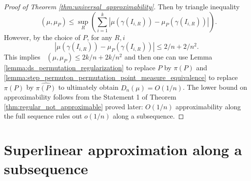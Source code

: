 \documentclass{article}
\newcommand{\ds}{\mathop{d_\square}}
\theoremstyle{definition}
\begin{document}
\begin{proof}[Proof of Theorem \ref{thm:universal_approximability}]
    Then by triangle inequality
    $$\ds (\mu, \mu_P)\leq \sup_R \left(\sum_{i=1}^{k}|\mu(\gamma(I_{i, R}))-\mu_P(\gamma(I_{i, R}))|\right).$$
    However, by the choice of $P$, for any $R, i$ 
    $$|\mu(\gamma(I_{i, R}))-\mu_P(\gamma(I_{i, R}))|\leq 2/n+2/n^2.$$
    This implies $\ds(\mu, \mu_P)\leq 2k/n+2k/n^2$ and then one can use Lemma \ref{lemma:ds_permutation_regularization} to replace $P$ by $\pi(P)$ and \ref{lemma:step_permuton_permutation_point_measure_equivalence} to replace $\pi(P)$ by $\widehat{\pi(P)}$ to ultimately obtain $D_n(\mu)=O(1/n)$. The lower bound on approximability follows from the Statement 1 of Theorem \ref{thm:regular_not_approximable} proved later: $O(1/n)$ approximability along the full sequence rules out $o(1/n)$ along a subsequence.
\end{proof}

\section{Superlinear approximation along a subsequence} \label{sec:superlin_approx}
\end{document}
